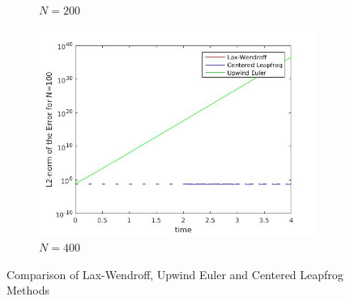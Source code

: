 \begin{figure}[H]
\begin{subfigure}[b]{0.3\textwidth}
  \caption{$N=200$}
\end{subfigure}
\hfill
\begin{subfigure}[b]{0.3\textwidth}
  \includegraphics[width=\textwidth]{Images/adv_step_400.jpg}
  \caption{$N=400$}
\end{subfigure}
\caption{Comparison of Lax-Wendroff, Upwind Euler and Centered Leapfrog Methods}
\label{fig:stepcompare}
\end{figure}


